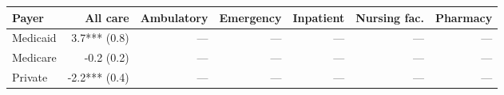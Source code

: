\begin{tabular}{@{}l rrrrrr@{}}
\toprule
Payer & All care & Ambulatory & Emergency & Inpatient & Nursing fac. & Pharmacy \\
\midrule
Medicaid & 3.7*** (0.8) & --- & --- & --- & --- & --- \\
Medicare & -0.2 (0.2) & --- & --- & --- & --- & --- \\
Private & -2.2*** (0.4) & --- & --- & --- & --- & --- \\
\bottomrule
\end{tabular}
